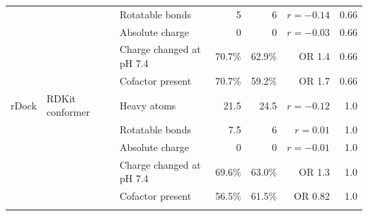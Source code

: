 \begin{longtable}{lllrrrr}
 &  & Rotatable bonds & 5 & 6 & $r = -0.14$ & 0.66 \\
 &  & Absolute charge & 0 & 0 & $r = -0.03$ & 0.66 \\
 &  & Charge changed at pH 7.4 & 70.7\% & 62.9\% & OR 1.4 & 0.66 \\
 &  & Cofactor present & 70.7\% & 59.2\% & OR 1.7 & 0.66 \\
\addlinespace
rDock & RDKit conformer & Heavy atoms & 21.5 & 24.5 & $r = -0.12$ & 1.0 \\
 &  & Rotatable bonds & 7.5 & 6 & $r = 0.01$ & 1.0 \\
 &  & Absolute charge & 0 & 0 & $r = -0.01$ & 1.0 \\
 &  & Charge changed at pH 7.4 & 69.6\% & 63.0\% & OR 1.3 & 1.0 \\
 &  & Cofactor present & 56.5\% & 61.5\% & OR 0.82 & 1.0 \\
\addlinespace
\end{longtable}
